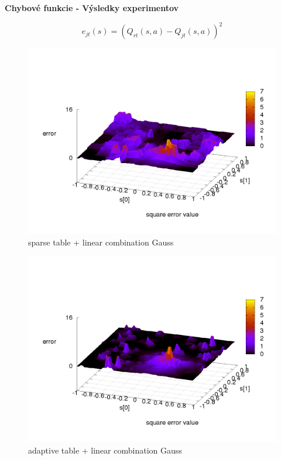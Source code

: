 \documentclass[xcolor=dvipsnames]{beamer}
\begin{document}
\begin{frame}{\bf Chybové funkcie - Výsledky experimentov}

\begin{equation}
e_{jt}(s) = (Q_{rt}(s,a) - Q_{jt}(s,a))^2  \nonumber
\end{equation}

\begin{minipage}{.5\textwidth}

\begin{figure}[!htb]
\centering
\includegraphics[scale=.2]{../../results_q_learning/map_2/function_type_3/q_learning_error.png}
\caption{sparse table + linear combination Gauss}
\end{figure}

\end{minipage}%
\begin{minipage}{.5\textwidth}

\begin{figure}[!htb]
\centering
\includegraphics[scale=.2]{../../results_q_learning/map_2/function_type_6/q_learning_error.png}
\caption{adaptive table + linear combination Gauss}
\end{figure}


\end{minipage}
\end{frame}
\end{document}
